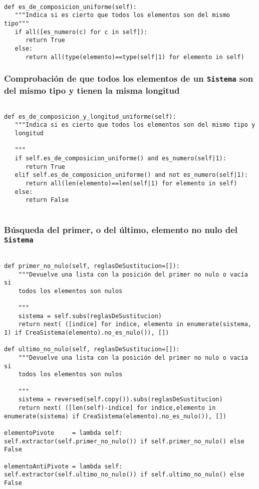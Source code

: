 \documentclass[11pt]{report}
\begin{document}
\begin{verbatim}

def es_de_composicion_uniforme(self):
   """Indica si es cierto que todos los elementos son del mismo tipo"""
   if all([es_numero(c) for c in self]):
      return True
   else:
      return all(type(elemento)==type(self|1) for elemento in self)

\end{verbatim}

\subsubsection{Comprobación de que todos los elementos de un \texttt{Sistema} son del mismo tipo y tienen la misma longitud}
\label{sec:org88a2afb}

\begin{verbatim}

def es_de_composicion_y_longitud_uniforme(self):
   """Indica si es cierto que todos los elementos son del mismo tipo y
   longitud

   """
   if self.es_de_composicion_uniforme() and es_numero(self|1):
      return True
   elif self.es_de_composicion_uniforme() and not es_numero(self|1):
      return all(len(elemento)==len(self|1) for elemento in self)
   else:
      return False
   
\end{verbatim}

\subsubsection{Búsqueda del primer, o del último, elemento no nulo del \texttt{Sistema}}
\label{sec:org2f65c99}

\begin{verbatim}

def primer_no_nulo(self, reglasDeSustitucion=[]):
    """Devuelve una lista con la posición del primer no nulo o vacía si
    todos los elementos son nulos

    """
    sistema = self.subs(reglasDeSustitucion)
    return next( ([indice] for indice, elemento in enumerate(sistema, 1) if CreaSistema(elemento).no_es_nulo()), [])

def ultimo_no_nulo(self, reglasDeSustitucion=[]):
    """Devuelve una lista con la posición del primer no nulo o vacía si
    todos los elementos son nulos

    """
    sistema = reversed(self.copy()).subs(reglasDeSustitucion)
    return next( ([len(self)-indice] for indice,elemento in enumerate(sistema) if CreaSistema(elemento).no_es_nulo()), [])

elementoPivote     = lambda self:  self.extractor(self.primer_no_nulo()) if self.primer_no_nulo() else False

elementoAntiPivote = lambda self:  self.extractor(self.ultimo_no_nulo()) if self.ultimo_no_nulo() else False

\end{verbatim}
\end{document}
